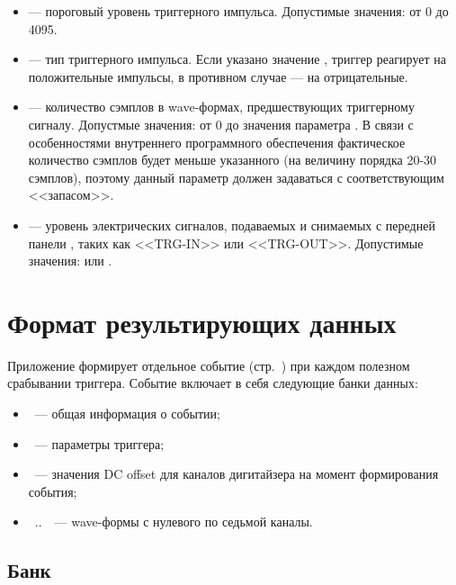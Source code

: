 \begin{itemize}
\item {} --- пороговый уровень триггерного импульса. Допустимые значения: от 0 до 4095.

\item {} --- тип триггерного импульса. Если указано значение , триггер реагирует на положительные импульсы, в противном случае --- на отрицательные.

\item 
\label{item-pre-trigger-length}

 --- количество сэмплов в wave-формах, предшествующих триггерному сигналу. Допустмые значения: от 0 до значения параметра . В связи с особенностями внутреннего программного обеспечения \DEVICE{} \cite{CaenUM5961PostTrigger} фактическое количество сэмплов будет меньше указанного (на величину порядка 20-30 сэмплов), поэтому данный параметр должен задаваться с соответствующим <<запасом>>.

\item {} --- уровень электрических сигналов, подаваемых и снимаемых с передней панели \DEVICE{}, таких как <<TRG-IN>> или <<TRG-OUT>>. Допустимые значения:  или .

\end{itemize}

\section{Формат результирующих данных}

Приложение  формирует отдельное событие (стр.~\pageref{sec-midas-event}) при каждом полезном срабывании триггера. Событие включает в себя следующие банки данных:

\begin{itemize}

\item {}~--- общая информация о событии;
\item {}~--- параметры триггера;
\item {}~--- значения DC offset для каналов дигитайзера на момент формирования события;
\item {}~..~~--- wave-формы с нулевого по седьмой каналы.

\end{itemize}

\subsection{Банк }
\label{sec_bank_info}

